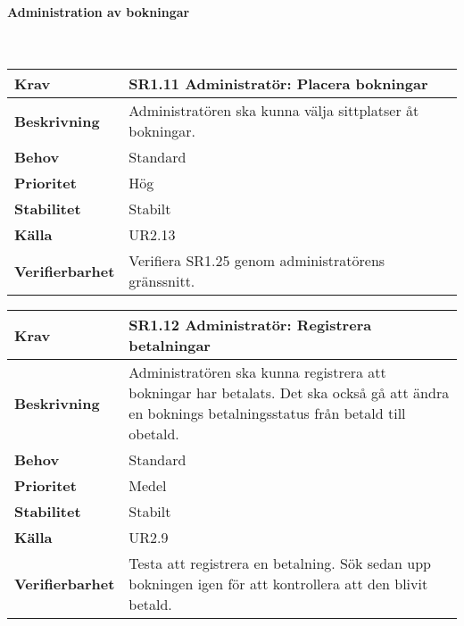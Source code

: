 \documentclass[a4paper, twoside, 11pt, titlepage]{article}
\begin{document}
			\paragraph{Administration av bokningar}\

			\begin {table} [ht] \begin{tabular} { p{2.6cm} p{12.5cm} }
				\hline
				\sffamily\textbf{Krav} & \sffamily\textbf{SR1.11 Administratör: Placera bokningar } \\
				\hline
				\sffamily\textbf{Beskrivning} & Administratören ska kunna välja sittplatser åt bokningar.  \\
				\hline
				\sffamily\textbf{Behov} & Standard  \\
				\hline
				\sffamily\textbf{Prioritet} & Hög  \\
				\hline
				\sffamily\textbf{Stabilitet} & Stabilt  \\
				\hline
				\sffamily\textbf{Källa} & UR2.13  \\
				\hline
				\sffamily\textbf{Verifierbarhet} & Verifiera SR1.25 genom administratörens gränssnitt.  \\
				\hline
			\end{tabular} \end{table} \FloatBarrier
			\vspace{6mm}

			\begin {table} [ht] \begin{tabular} { p{2.6cm} p{12.5cm} }
				\hline
				\sffamily\textbf{Krav} & \sffamily\textbf{SR1.12 Administratör: Registrera betalningar } \\
				\hline
				\sffamily\textbf{Beskrivning} & Administratören ska kunna registrera att bokningar har betalats. Det ska också gå att ändra en boknings betalningsstatus från betald till obetald.  \\
				\hline
				\sffamily\textbf{Behov} & Standard  \\
				\hline
				\sffamily\textbf{Prioritet} & Medel  \\
				\hline
				\sffamily\textbf{Stabilitet} & Stabilt  \\
				\hline
				\sffamily\textbf{Källa} & UR2.9  \\
				\hline
				\sffamily\textbf{Verifierbarhet} & Testa att registrera en betalning. Sök sedan upp bokningen igen för att kontrollera att den blivit betald.  \\
				\hline
			\end{tabular} \end{table} \FloatBarrier
			\vspace{6mm}
\end{document}
